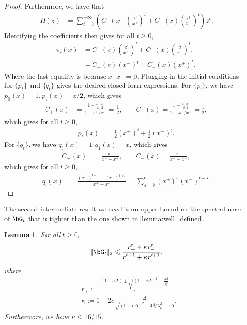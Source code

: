 \documentclass{article}
\theoremstyle{plain}
\newtheorem{lemma}[theorem]{Lemma}
\theoremstyle{definition}
\theoremstyle{remark}
\begin{document}
\begin{proof}
  Furthermore, we have that 
  \begin{align*}
    \Pi(z) & = \sum_{t=0}^{+\infty} \left(C_+(x) \left(\frac{\beta}{x^+}\right)^{t} + C_-(x) \left(\frac{\beta}{x^-}\right)^{t}\right) z^t.
  \end{align*}
  Identifying the coefficients then gives for all $t\geqslant 0$,
  \begin{align*}
    \pi_t(x) & = C_+(x) \left(\frac{\beta}{x^+}\right)^{t} + C_-(x) \left(\frac{\beta}{x^-}\right)^{t}, \\
    & = C_+(x) (x^-)^{t} + C_-(x) (x^+)^{t},
  \end{align*}
  Where the last equality is because $x^+ x^- = \beta$. Plugging in the initial conditions for $\{p_t\}$ and $\{q_t\}$ gives the desired closed-form expressions. For $\{p_t\}$, we have $p_0(x) = 1, p_1(x) = x/2$, which gives
  \begin{align*}
    C_+(x) & = \frac{1 - \frac{x^+}{\beta}\frac{x}{2}}{1 - x^+/x^-} = \frac{1}{2}, \qquad C_-(x)  = \frac{1 - \frac{x^-}{\beta}\frac{x}{2}}{1 - x^-/x^+} = \frac{1}{2},
  \end{align*}
  which gives for all $t \geqslant 0$,
  \begin{align*}
    p_t(x) & = \frac{1}{2} (x^+)^t + \frac{1}{2} (x^-)^t.
  \end{align*}
  For $\{q_t\}$, we have $q_0(x) = 1, q_1(x) = x$, which gives
  \begin{align*}
    C_+(x) & = \frac{x^-}{x^- - x^+}, \qquad C_-(x)  = \frac{x^+}{x^+ - x^-},
  \end{align*}
  which gives for all $t \geqslant 0$,
  \begin{align*}
    q_t(x) & = \frac{(x^+)^{t+1} - (x^-)^{t+1}}{x^+ - x^-} = \sum_{s=0}^{t} (x^+)^s (x^-)^{t-s}.
  \end{align*}
\end{proof}

The second intermediate result we need is an upper bound on the spectral norm of $\bG_t$ that is tighter than the one shown in \cref{lemma:well_defined}.

\begin{lemma}\label{lemma:gt_inv_bound}
  For all $t\geqslant 0$,
  \begin{align*}
    \Vert \bG_t \Vert_2 \leqslant \frac{r_+^t + \kappa r_-^t}{r_+^{t+1} + \kappa r_-^{t+1}},
  \end{align*}
  where
  \begin{align*}
    & r_\pm := \frac{(1 - c\Delta) \pm \sqrt{(1 - c\Delta)^2 - \frac{4\beta}{\lambda_k^2}}}{2}, \\
    & \kappa := 1 + 2c\frac{\Delta}{\sqrt{(1-c\Delta)^2 - 4\beta/\lambda_k^2} - c\Delta}.
  \end{align*}
  Furthermore, we have $\kappa \leqslant 16/15$.
\end{lemma}
\end{document}
